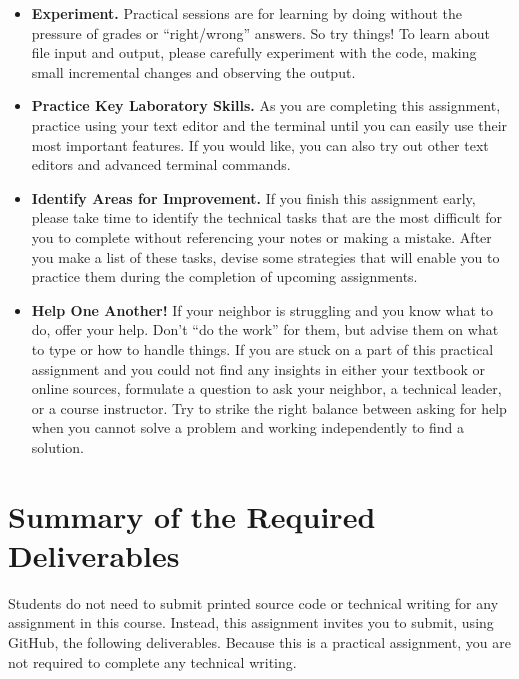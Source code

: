 \documentclass[11pt]{article}
\begin{document}
\vspace*{-.05in}
\begin{itemize}

\itemsep 0in

\item {\bf Experiment.} Practical sessions are for learning by doing without the
  pressure of grades or ``right/wrong'' answers. So try things! To learn about
  file input and output, please carefully experiment with the code, making small
  incremental changes and observing the output.

\item {\bf Practice Key Laboratory Skills.} As you are completing this
  assignment, practice using your text editor and the terminal until you can
  easily use their most important features. If you would like, you can also try
  out other text editors and advanced terminal commands.

\item {\bf Identify Areas for Improvement.} If you finish this assignment early,
  please take time to identify the technical tasks that are the most difficult
  for you to complete without referencing your notes or making a mistake. After
  you make a list of these tasks, devise some strategies that will enable you to
  practice them during the completion of upcoming assignments.

\item {\bf Help One Another!} If your neighbor is struggling and you know what
  to do, offer your help. Don't ``do the work'' for them, but advise them on
  what to type or how to handle things. If you are stuck on a part of this
  practical assignment and you could not find any insights in either your
  textbook or online sources, formulate a question to ask your neighbor, a
  technical leader, or a course instructor. Try to strike the right balance
  between asking for help when you cannot solve a problem and working
  independently to find a solution.

\end{itemize}

\section*{Summary of the Required Deliverables}

\noindent Students do not need to submit printed source code or technical
writing for any assignment in this course. Instead, this assignment invites you
to submit, using GitHub, the following deliverables. Because this is a practical
assignment, you are not required to complete any technical writing.
\end{document}
